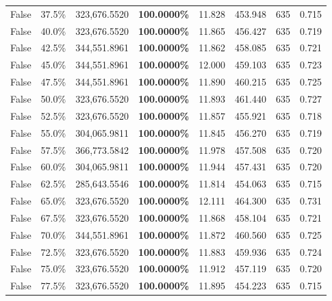 \begin{table}[H]
\begin{tabular}{lllrllll}
\cline{1-8}
False & 37.5\% & 323,676.5520 & \bfseries \color{red} 100.0000\% & 11.828 & 453.948 & 635 & 0.715 \\
\cline{1-8}
False & 40.0\% & 323,676.5520 & \bfseries \color{red} 100.0000\% & 11.865 & 456.427 & 635 & 0.719 \\
\cline{1-8}
False & 42.5\% & 344,551.8961 & \bfseries \color{red} 100.0000\% & 11.862 & 458.085 & 635 & 0.721 \\
\cline{1-8}
False & 45.0\% & 344,551.8961 & \bfseries \color{red} 100.0000\% & 12.000 & 459.103 & 635 & 0.723 \\
\cline{1-8}
False & 47.5\% & 344,551.8961 & \bfseries \color{red} 100.0000\% & 11.890 & 460.215 & 635 & 0.725 \\
\cline{1-8}
False & 50.0\% & 323,676.5520 & \bfseries \color{red} 100.0000\% & 11.893 & 461.440 & 635 & 0.727 \\
\cline{1-8}
False & 52.5\% & 323,676.5520 & \bfseries \color{red} 100.0000\% & 11.857 & 455.921 & 635 & 0.718 \\
\cline{1-8}
False & 55.0\% & 304,065.9811 & \bfseries \color{red} 100.0000\% & 11.845 & 456.270 & 635 & 0.719 \\
\cline{1-8}
False & 57.5\% & 366,773.5842 & \bfseries \color{red} 100.0000\% & 11.978 & 457.508 & 635 & 0.720 \\
\cline{1-8}
False & 60.0\% & 304,065.9811 & \bfseries \color{red} 100.0000\% & 11.944 & 457.431 & 635 & 0.720 \\
\cline{1-8}
False & 62.5\% & \color{red} 285,643.5546 & \bfseries \color{red} 100.0000\% & 11.814 & 454.063 & 635 & 0.715 \\
\cline{1-8}
False & 65.0\% & 323,676.5520 & \bfseries \color{red} 100.0000\% & 12.111 & 464.300 & 635 & 0.731 \\
\cline{1-8}
False & 67.5\% & 323,676.5520 & \bfseries \color{red} 100.0000\% & 11.868 & 458.104 & 635 & 0.721 \\
\cline{1-8}
False & 70.0\% & 344,551.8961 & \bfseries \color{red} 100.0000\% & 11.872 & 460.560 & 635 & 0.725 \\
\cline{1-8}
False & 72.5\% & 323,676.5520 & \bfseries \color{red} 100.0000\% & 11.883 & 459.936 & 635 & 0.724 \\
\cline{1-8}
False & 75.0\% & 323,676.5520 & \bfseries \color{red} 100.0000\% & 11.912 & 457.119 & 635 & 0.720 \\
\cline{1-8}
False & 77.5\% & 323,676.5520 & \bfseries \color{red} 100.0000\% & 11.895 & 454.223 & 635 & 0.715 \\

\end{tabular}
\end{table}
